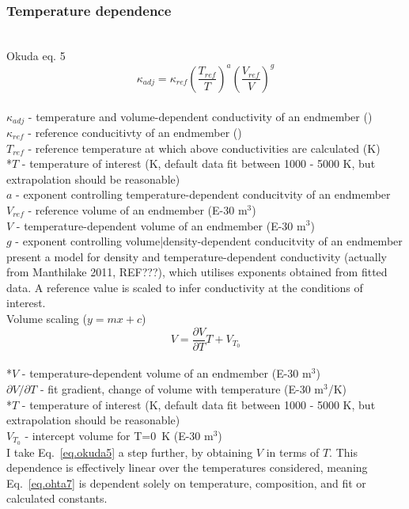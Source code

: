 \subsubsection{Temperature dependence}

\cite{Okuda2017}\\

Okuda eq. 5 
\begin{equation}%
\kappa_{adj}=\kappa_{ref}\left ( \frac{T_{ref}}{T} \right )^{a}\left ( \frac{V_{ref}}{V} \right )^{g}
\label{eq.okuda5}
\end{equation}%
\\ $\kappa_{adj}$ - temperature and volume-dependent conductivity of an endmember (\wmk)\\
$\kappa_{ref}$ - reference conducitivty of an endmember (\wmk)\\
$T_{ref}$ - reference temperature at which above conductivities are calculated (K)\\
*$T$ - temperature of interest (K, default data fit between 1000 - 5000 K, but extrapolation should be reasonable)\\   
$a$ - exponent controlling temperature-dependent conducitvity of an endmember\\
$V_{ref}$ - reference volume of an endmember (E-30 m$^3$)\\
$V$ - temperature-dependent volume of an endmember (E-30 m$^3$)\\
$g$ - exponent controlling volume|density-dependent conducitvity of an endmember\\

\citet{Okuda2017} present a model for density and temperature-dependent conductivity (actually from Manthilake 2011, REF???), which utilises exponents obtained from fitted data. A reference value is scaled to infer conductivity at the conditions of interest.\\

Volume scaling ($y=mx+c$)  
\begin{equation}%
V=\frac{\partial V}{\partial T} T+V_{T_{0}}
\label{eq.vol_scale}
\end{equation}%
\\ *$V$ - temperature-dependent volume of an endmember (E-30 m$^3$)\\          
${\partial V}/{\partial T}$ - fit gradient, change of volume with temperature (E-30 m$^3$/K)\\
*$T$ - temperature of interest (K, default data fit between 1000 - 5000 K, but extrapolation should be reasonable)\\
$V_{T_{0}}$ - intercept volume for T=0~K (E-30 m$^3$)\\

I take Eq.~\ref{eq.okuda5} \citep[][Eq. 5]{Okuda2017} a step further, by obtaining $V$ in terms of $T$. This dependence is effectively linear over the temperatures considered, meaning Eq.~\ref{eq.ohta7} \citep[][Eq. 7]{Ohta2017} is dependent solely on temperature, composition, and fit or calculated constants.
                     
\pagebreak